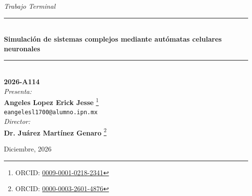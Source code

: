 \begin{center}

	{\fontsize{14}{17}\selectfont \textit{Trabajo Terminal}}\\[0.2cm]

	\rule{0.6\textwidth}{0.4pt}\\[0.4cm]
	{\fontsize{16}{19}\selectfont \textbf{Simulación de sistemas complejos mediante autómatas celulares neuronales}}\\
	\rule{0.6\textwidth}{0.4pt}\\[0.2cm]
	{\fontsize{14}{17}\selectfont \textbf{2026-A114}}\\[2cm]

	{\fontsize{14}{17}\selectfont \textit{Presenta:}}\\[0.4cm]
	{\fontsize{14}{17}\selectfont \textbf{Angeles Lopez Erick Jesse}}%
	{\renewcommand{\thefootnote}{\fnsymbol{footnote}}%
	\footnote[1]{ORCID: \href{https://orcid.org/0009-0001-0218-2341}{0009-0001-0218-2341}}}\\[0.2cm]
	{\small \texttt{eangelesl1700@alumno.ipn.mx}}\\[2cm]

	{\fontsize{14}{17}\selectfont \textit{Director:}}\\[0.4cm]
	{\fontsize{14}{17}\selectfont \textbf{Dr. Juárez Martínez Genaro}}%
	{\renewcommand{\thefootnote}{\fnsymbol{footnote}}%
	\footnote[2]{ORCID: \href{https://orcid.org/0000-0003-2601-4876}{0000-0003-2601-4876}}}

	\vfill

	{\raggedleft \fontsize{14}{17}\selectfont Diciembre, 2026\par}

\end{center}
\restoregeometry
\onehalfspacing

